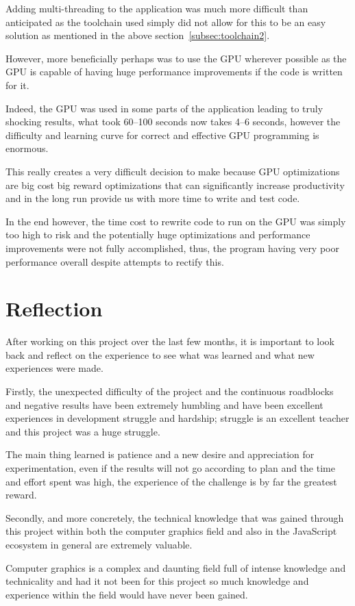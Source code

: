 \documentclass[12pt]{article}
\newcommand{\sentence}{} %
\renewcommand{\fullref}[1]{\ref{#1}\nameref{#1}}
\begin{document}
    \bigskip
    \sentence
    Adding multi-threading to the application was much more difficult than anticipated as the toolchain used simply
    did not allow for this to be an easy solution as mentioned in the above section~\fullref{subsec:toolchain2}.
    \sentence
    However, more beneficially perhaps was to use the GPU wherever possible as the GPU is capable of having huge
    performance improvements if the code is written for it.
    \sentence
    Indeed, the GPU was used in some parts of the application leading to truly shocking results, what took 60--100
    seconds now takes 4--6 seconds, however the difficulty and learning curve for correct and effective GPU
    programming is enormous.
    \sentence
    This really creates a very difficult decision to make because GPU optimizations are big cost big reward
    optimizations that can significantly increase productivity and in the long run provide us with more time to write
    and test code.
    \sentence
    In the end however, the time cost to rewrite code to run on the GPU was simply too high to risk and the
    potentially huge optimizations and performance improvements were not fully accomplished, thus, the program having
    very poor performance overall despite attempts to rectify this.

    \pagebreak


    \section{Reflection}\label{sec:reflection}

    \tab
    After working on this project over the last few months, it is important to look back and reflect on the
    experience to see what was learned and what new experiences were made.
    \sentence
    Firstly, the unexpected difficulty of the project and the continuous roadblocks and negative results have been
    extremely humbling and have been excellent experiences in development struggle and hardship;
    struggle is an excellent teacher and this project was a huge struggle.
    \sentence
    The main thing learned is patience and a new desire and appreciation for experimentation, even if the results
    will not go according to plan and the time and effort spent was high, the experience of the challenge is by far
    the greatest reward.
    \sentence
    Secondly, and more concretely, the technical knowledge that was gained through this project within both the
    computer graphics field and also in the JavaScript ecosystem in general are extremely valuable.
    \sentence
    Computer graphics is a complex and daunting field full of intense knowledge and technicality and had it not been
    for this project so much knowledge and experience within the field would have never been gained.
\end{document}
